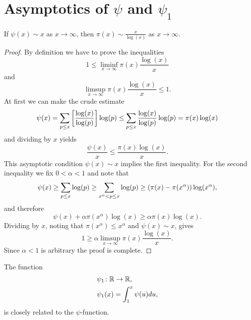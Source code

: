 \section{Asymptotics of $\psi$ and $\psi_1$}


\begin{lemma}
	If $\psi(x) \sim x$ as $x \to \infty$, then $\pi(x) \sim \frac{x}{\log(x)}$ as $x \to \infty$.
\end{lemma}
\begin{proof}
	By definition we have to prove the inequalities
\begin{equation*}
	1 \leq \liminf _{x \to \infty} \pi(x) \frac{\log(x)}{x}
\end{equation*}
	and
\begin{equation*}
	\limsup _{x \to \infty} \pi(x) \frac{\log(x)}{x} \leq 1.
\end{equation*}
	At first we can make the crude estimate
\begin{equation*}
	\psi(x) = \sum _{p \leq x} \left[\frac{\log(x)}{\log(p)}\right] \log(p) \leq \sum _{p \leq x} \frac{\log(x)}{\log(p)} \log(p) = \pi(x) \log(x)
\end{equation*}
	and dividing by $x$ yields
\begin{equation*}
	\frac{\psi(x)}{x} \leq \frac{\pi(x) \log(x)}{x}.
\end{equation*}
	This asymptotic condition $\psi(x) \sim x$ implies the first inequality. For the second inequality we fix $0 < \alpha < 1$ and note that
\begin{equation*}
	\psi(x) \geq \sum _{p \leq x} \log(p) \geq \sum _{x^\alpha < p \leq x} \log(p) \geq \left(\pi(x) - \pi(x^\alpha)\right) \log(x^\alpha),
\end{equation*}
	and therefore
\begin{equation*}
	\psi(x) + \alpha \pi(x^\alpha) \log(x) \geq \alpha \pi(x) \log(x).
\end{equation*}
	Dividing by $x$, noting that $\pi(x^\alpha) \leq x^\alpha$ and $\psi(x) \sim x$, gives
\begin{equation*}
	1 \geq \alpha \limsup _{x \to \infty} \pi(x) \frac{\log(x)}{x}.
\end{equation*}
	Since $\alpha < 1$ is arbitrary the proof is complete.
\end{proof}


\begin{definition}
	The function
\begin{equation*}
\begin{aligned}
	&\psi_1 \colon \mathbb{R} \to \mathbb{R}, \\
	&\psi_1(x) = \int _1 ^x \psi(u) du,
\end{aligned}
\end{equation*}
	is closely related to the $\psi$-function.
\end{definition}


